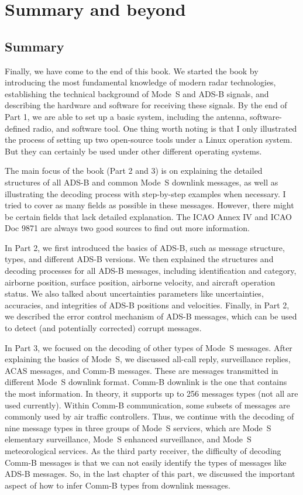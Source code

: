 \chapter{Summary and beyond}

\section{Summary}
Finally, we have come to the end of this book. We started the book by introducing the most fundamental knowledge of modern radar technologies, establishing the technical background of Mode~S and ADS-B signals, and describing the hardware and software for receiving these signals. By the end of Part 1, we are able to set up a basic system, including the antenna, software-defined radio, and software tool. One thing worth noting is that I only illustrated the process of setting up two open-source tools under a Linux operation system. But they can certainly be used under other different operating systems.

The main focus of the book (Part 2 and 3) is on explaining the detailed structures of all ADS-B and common Mode~S downlink messages, as well as illustrating the decoding process with step-by-step examples when necessary. I tried to cover as many fields as possible in these messages. However, there might be certain fields that lack detailed explanation. The ICAO Annex IV and ICAO Doc 9871 are always two good sources to find out more information.

In Part 2, we first introduced the basics of ADS-B, such as message structure, types, and different ADS-B versions. We then explained the structures and decoding processes for all ADS-B messages, including identification and category, airborne position, surface position, airborne velocity, and aircraft operation status. We also talked about uncertainties parameters like uncertainties, accuracies, and integrities of ADS-B positions and velocities. Finally, in Part 2, we described the error control mechanism of ADS-B messages, which can be used to detect (and potentially corrected) corrupt messages.

In Part 3, we focused on the decoding of other types of Mode~S messages. After explaining the basics of Mode~S, we discussed all-call reply, surveillance replies, ACAS messages, and Comm-B messages. These are messages transmitted in different Mode~S downlink format. Comm-B downlink is the one that contains the most information. In theory, it supports up to 256 messages types (not all are used currently). Within Comm-B communication, some subsets of messages are commonly used by air traffic controllers. Thus, we continue with the decoding of nine message types in three groups of Mode~S services, which are Mode~S elementary surveillance, Mode~S enhanced surveillance, and Mode~S meteorological services. As the third party receiver, the difficulty of decoding Comm-B messages is that we can not easily identify the types of messages like ADS-B messages. So, in the last chapter of this part, we discussed the important aspect of how to infer Comm-B types from downlink messages.


